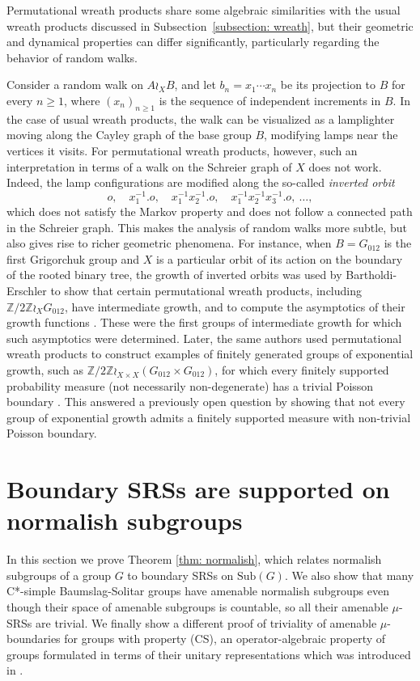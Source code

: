 \documentclass[reqno,a4paper,11pt]{amsart}
\numberwithin{equation}{section}
\newcommand{\1}{\mathbf{1}}
\theoremstyle{definition}
\begin{document}
	
	Permutational wreath products share some algebraic similarities with the usual wreath products discussed in Subsection~\ref{subsection: wreath}, but their geometric and dynamical properties can differ significantly, particularly regarding the behavior of random walks.
	
	Consider a random walk on $A \wr_X B$, and let $b_n = x_1 \cdots x_n$ be its projection to $B$ for every $n \ge 1$, where $(x_n)_{n\ge1}$ is the sequence of independent increments in $B$. In the case of usual wreath products, the walk can be visualized as a lamplighter moving along the Cayley graph of the base group $B$, modifying lamps near the vertices it visits. For permutational wreath products, however, such an interpretation in terms of a walk on the Schreier graph of $X$ does not work. Indeed, the lamp configurations are modified along the so-called \emph{inverted orbit}
	\[
	o, \quad x_1^{-1}.o, \quad x_1^{-1}x_2^{-1}.o, \quad x_1^{-1}x_2^{-1}x_3^{-1}.o, \ \ldots,
	\]
	which does not satisfy the Markov property and does not follow a connected path in the Schreier graph. This makes the analysis of random walks more subtle, but also gives rise to richer geometric phenomena. For instance, when $B=G_{012}$ is the first Grigorchuk group and $X$ is a particular orbit of its action on the boundary of the rooted binary tree, the growth of inverted orbits was used by Bartholdi-Erschler to show that certain permutational wreath products, including $\mathbb{Z}/2\mathbb{Z}\wr_X G_{012}$, have intermediate growth, and to compute the asymptotics of their growth functions \cite[Theorem A]{BartholdiErschler2012}. These were the first groups of intermediate growth for which such asymptotics were determined. Later, the same authors used permutational wreath products to construct examples of finitely generated groups of exponential growth, such as $\mathbb{Z}/2\mathbb{Z}\wr_{X\times X} (G_{012}\times G_{012})$, for which every finitely supported probability measure (not necessarily non-degenerate) has a trivial Poisson boundary \cite[Theorem A]{BartholdiErschler2017}. 
	This answered a previously open question by showing that not every group of exponential growth admits a finitely supported measure with non-trivial Poisson boundary.
	
	
\section{Boundary SRSs are supported on normalish subgroups} \label{sec:normalish}
In this section we prove Theorem \ref{thm: normalish}, which relates normalish subgroups of a group $G$ to boundary SRSs on $\mathrm{Sub}(G)$. We also show that many C*-simple Baumslag-Solitar groups have amenable normalish subgroups even though their space of amenable subgroups is countable, so all their amenable $\mu$-SRSs are trivial. We finally show a different proof of triviality of amenable $\mu$-boundaries for groups with property (CS), an operator-algebraic property of groups formulated in terms of their unitary representations which was introduced in \cite{BreuillardKalantarKennedyOzawa2017}.
\end{document}
